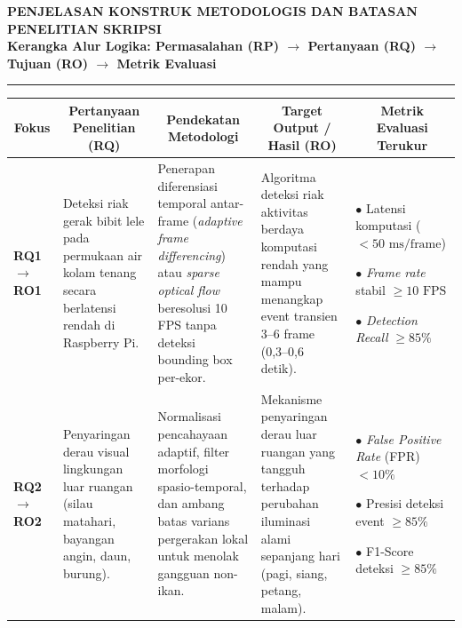 \documentclass[10pt,a4paper]{article}
\providecommand{\text}[1]{\mbox{#1}}
\begin{document}
\newpage


\begin{center}
    {\large \textbf{\color{navy}PENJELASAN KONSTRUK METODOLOGIS DAN BATASAN PENELITIAN SKRIPSI}}\\[2pt]
    {\normalsize \textbf{Kerangka Alur Logika: Permasalahan (RP) $\rightarrow$ Pertanyaan (RQ) $\rightarrow$ Tujuan (RO) $\rightarrow$ Metrik Evaluasi}}\\[4pt]
    \rule{\textwidth}{0.8pt}
\end{center}

\vspace{-0.1cm}

\begin{table}[h!]
\centering
\footnotesize
\renewcommand{\arraystretch}{1.2}
\setlength{\tabcolsep}{5pt}
\begin{tabular}{|p{1.4cm}|p{6.0cm}|p{6.3cm}|p{6.2cm}|p{5.4cm}|}
\hline
\multicolumn{1}{|c|}{\textbf{\color{navy}Fokus}} & 
\multicolumn{1}{c|}{\textbf{\color{navy}Pertanyaan Penelitian (RQ)}} & 
\multicolumn{1}{c|}{\textbf{\color{navy}Pendekatan Metodologi}} & 
\multicolumn{1}{c|}{\textbf{\color{navy}Target Output / Hasil (RO)}} & 
\multicolumn{1}{c|}{\textbf{\color{navy}Metrik Evaluasi Terukur}} \\
\hline

\textbf{RQ1 $\rightarrow$ RO1} & 
Deteksi riak gerak bibit lele pada permukaan air kolam tenang secara berlatensi rendah di Raspberry Pi. & 
Penerapan diferensiasi temporal antar-frame (\textit{adaptive frame differencing}) atau \textit{sparse optical flow} beresolusi 10 FPS tanpa deteksi bounding box per-ekor. & 
Algoritma deteksi riak aktivitas berdaya komputasi rendah yang mampu menangkap event transien 3--6 frame (0,3--0,6 detik). & 
$\bullet$ Latensi komputasi ($< 50\text{ ms/frame}$)\par
$\bullet$ \textit{Frame rate} stabil $\ge 10\text{ FPS}$\par
$\bullet$ \textit{Detection Recall} $\ge 85\%$ \\
\hline

\textbf{RQ2 $\rightarrow$ RO2} & 
Penyaringan derau visual lingkungan luar ruangan (silau matahari, bayangan angin, daun, burung). & 
Normalisasi pencahayaan adaptif, filter morfologi spasio-temporal, dan ambang batas varians pergerakan lokal untuk menolak gangguan non-ikan. & 
Mekanisme penyaringan derau luar ruangan yang tangguh terhadap perubahan iluminasi alami sepanjang hari (pagi, siang, petang, malam). & 
$\bullet$ \textit{False Positive Rate} (FPR) $< 10\%$\par
$\bullet$ Presisi deteksi event $\ge 85\%$\par
$\bullet$ F1-Score deteksi $\ge 85\%$ \\
\hline


\end{tabular}
\end{table}
\end{document}

